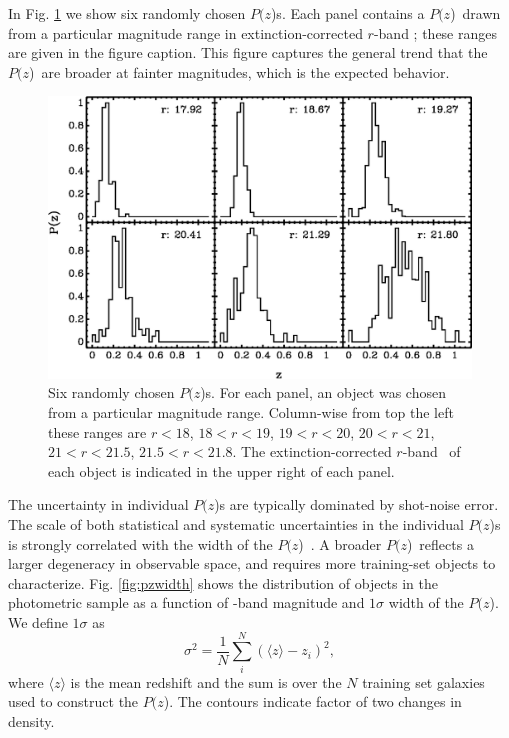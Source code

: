 \documentclass[12pt,preprint]{aastex}
\newcommand{\pofz}{$P(z$)}
\begin{document}
In Fig. \ref{fig:rand6pofz} we show six randomly chosen \pofz s.  Each panel
contains a \pofz\ drawn from a particular magnitude range in extinction-corrected
$r$-band \cmodelmag; these ranges are given in the figure caption.
This figure captures the general trend that the \pofz\ are broader at
fainter magnitudes, which is the expected behavior.

\begin{figure} [t]\centering
    \includegraphics[scale=0.7]{figures/seed25-5-6pofz.eps}
    \caption{Six randomly chosen \pofz s.  For each panel, an object was
    chosen from a particular magnitude range.  Column-wise from top the
    left these ranges are $r < 18$, $18 < r < 19$, $19 < r < 20$, 
    $20 < r < 21$, $21 < r < 21.5$, $21.5 < r < 21.8$.  
    The extinction-corrected $r$-band \cmodelmag\ of each object
    is indicated in the upper right of each panel.
    \label{fig:rand6pofz}}
\end{figure}

The uncertainty in individual \pofz s are typically dominated by shot-noise
error.  The scale of both statistical and systematic uncertainties in the
individual \pofz s is strongly correlated with the width of the \pofz\
\citep{CunhaPhotoz09}.  A broader \pofz\ reflects a larger degeneracy in
observable space, and requires more training-set objects to characterize.  Fig.
\ref{fig:pzwidth} shows the distribution of objects in the photometric sample
as a function of \rmag-band magnitude and $1 \sigma$ width of the \pofz.  We
define $1 \sigma$ as
\begin{equation}
\sigma^2 = \frac{1}{N} \sum_i^N (\langle z \rangle - z_i)^2,
\end{equation}
where $\langle z \rangle$ is the mean redshift and the sum is over the $N$
training set galaxies used to construct the \pofz.  The contours indicate factor
of two changes in density.  
\end{document}
